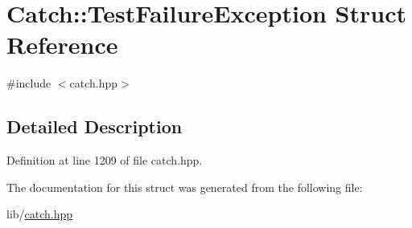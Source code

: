 \hypertarget{struct_catch_1_1_test_failure_exception}{}\section{Catch\+:\+:Test\+Failure\+Exception Struct Reference}
\label{struct_catch_1_1_test_failure_exception}


{\ttfamily \#include $<$catch.\+hpp$>$}



\subsection{Detailed Description}


Definition at line 1209 of file catch.\+hpp.



The documentation for this struct was generated from the following file\+:\begin{DoxyCompactItemize}
\item 
lib/\hyperlink{catch_8hpp}{catch.\+hpp}\end{DoxyCompactItemize}
